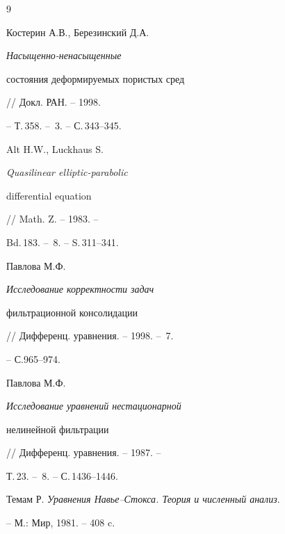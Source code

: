 \begin{thebibliography}{9}







Костерин А.В., Березинский Д.А. {\em Насыщенно-ненасыщенные


состояния деформируемых пористых сред} // Докл. РАН. -- 1998.


-- Т.\,358. -- \No\,3. -- С.\,343--345.




Alt H.W., Luckhaus S. {\em Quasilinear elliptic-parabolic


differential equation} // Math. Z. -- 1983. --


Bd.\,183. -- \No\,8. -- S.\,311--341.




Павлова М.Ф. {\em Исследование корректности задач


фильтрационной консолидации} // Дифференц. уравнения. -- 1998. -- \No\,7.


-- С.965--974.




Павлова М.Ф. {\em Исследование уравнений нестационарной


нелинейной фильтрации} // Дифференц. уравнения. -- 1987. --


Т.\,23. -- \No\,8. -- С.\,1436--1446.




Темам Р. {\em Уравнения Навье--Стокса. Теория и численный анализ}.


-- М.: Мир, 1981. -- 408 c.





\end{thebibliography}





\vskip 2cm












\label{end}





